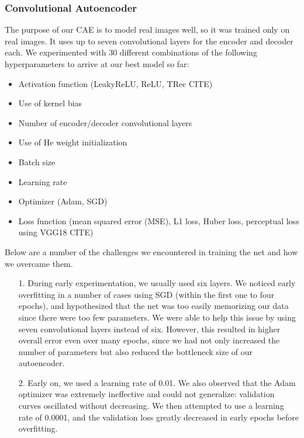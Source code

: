 \documentclass{article} %
\begin{document}
\subsubsection{Convolutional Autoencoder}

The purpose of our CAE is to model real images well, so it was trained only on real images. It uses up to seven convolutional layers for the encoder and decoder each. We experimented with 30 different combinations of the following hyperparameters to arrive at our best model so far:

\begin{itemize}
    \item Activation function (LeakyReLU, ReLU, TRec CITE)
    \item Use of kernel bias
    \item Number of encoder/decoder convolutional layers
    \item Use of He weight initialization
    \item Batch size
    \item Learning rate
    \item Optimizer (Adam, SGD)
    \item Loss function (mean squared error (MSE), L1 loss, Huber loss, perceptual loss using VGG18 CITE)
\end{itemize}

Below are a number of the challenges we encountered in training the net and how we overcame them.

\begin{itemize}
    \item[1.] During early experimentation, we usually used six layers. We noticed early overfitting in a number of cases using SGD (within the first one to four epochs), and hypothesized that the net was too easily memorizing our data since there were too few parameters. We were able to help this issue by using seven convolutional layers instead of six. However, this resulted in higher overall error even over many epochs, since we had not only increased the number of parameters but also reduced the bottleneck size of our autoencoder.
    \item[2.] Early on, we used a learning rate of 0.01. We also observed that the Adam optimizer was extremely ineffective and could not generalize: validation curves oscillated without decreasing. We then attempted to use a learning rate of 0.0001, and the validation loss greatly decreased in early epochs before overfitting.
\end{itemize}
\end{document}
